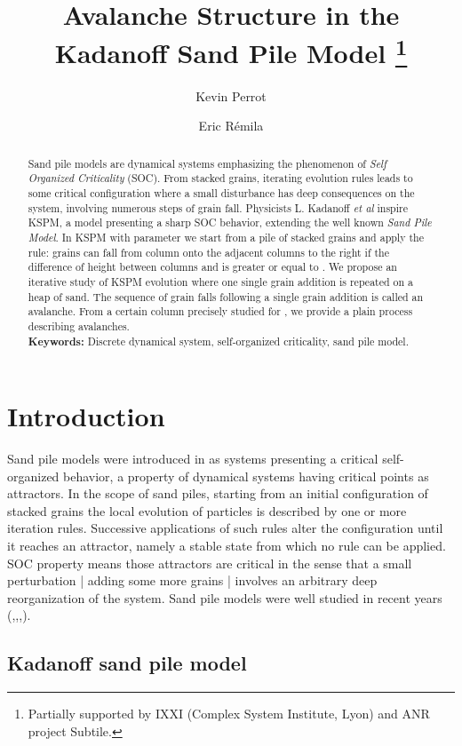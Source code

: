 \documentclass[11pt,a4paper]{llncs}
\title{Avalanche Structure in the Kadanoff Sand Pile Model
\thanks{Partially supported by  IXXI (Complex System Institute, Lyon) and ANR project  Subtile. }}
\author{Kevin Perrot \and Eric R\'emila}
\institute{Universit\'e  de Lyon\\
  Laboratoire de l'Informatique du Parall\'elisme, \\
  (umr 5668 CNRS - ENS Lyon - Universit\'e  Lyon 1),\\
46 all\'ee d'Italie 69364 Lyon Cedex 7 - France,\\
\email{\{kevin.perrot,eric.remila\}@ens-lyon.fr }}
\begin{document}
\maketitle

\begin{abstract}
  Sand pile models are dynamical systems emphasizing the phenomenon of {\em Self Organized Criticality} (SOC). From  stacked grains, iterating evolution rules leads to some critical configuration where a small disturbance has deep consequences on the system, involving numerous steps of grain fall. Physicists L. Kadanoff {\em et al} inspire KSPM, a model presenting a sharp SOC behavior, extending the well known {\em Sand Pile Model}. In KSPM with parameter  we start from a pile of  stacked grains and apply the rule:  grains can fall from column  onto the  adjacent columns to the right if the difference of height between columns  and  is greater or equal to . We propose an iterative study of KSPM evolution where one single grain addition is repeated on a heap of sand. The sequence of grain falls following a single grain addition is called an avalanche. From a certain column precisely studied for , we provide a plain process describing avalanches.\\
  
\textbf{Keywords:} Discrete dynamical system, self-organized criticality, sand pile model.

\end{abstract}

\section{Introduction}

Sand pile models were introduced in \cite{bak88} as systems presenting a critical self-organized behavior, a property of dynamical systems having critical points as attractors. In the scope of sand piles, starting from an initial configuration of  stacked grains the local evolution of particles is described by one or more iteration rules. Successive applications of such rules alter the configuration until it reaches an attractor, namely a stable state from which no rule can be applied. SOC property means those attractors are critical in the sense that a small perturbation | adding some more grains | involves an arbitrary deep reorganization of the system. Sand pile models were well studied in recent years (\cite{goles93},\cite{durandlose98},\cite{formenti07},\cite{phan08}).


\subsection{Kadanoff sand pile model}
\end{document}
